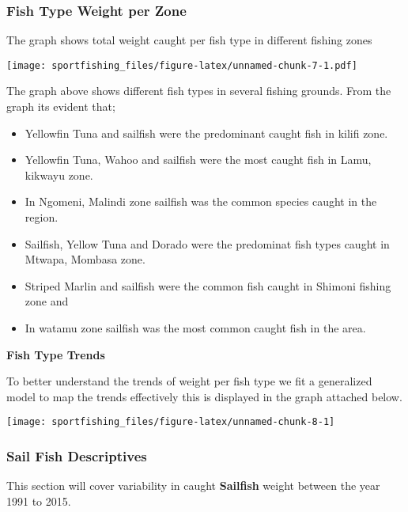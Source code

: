 \documentclass[
]{article}
\providecommand{\tightlist}{%
  \setlength{\itemsep}{0pt}\setlength{\parskip}{0pt}}
\begin{document}
\newpage

\subsubsection{Fish Type Weight per
Zone}\label{fish-type-weight-per-zone}

The graph shows total weight caught per fish type in different fishing
zones

\texttt{[image: sportfishing\_files/figure-latex/unnamed-chunk-7-1.pdf]}

The graph above shows different fish types in several fishing grounds.
From the graph its evident that;

\begin{itemize}
\tightlist
\item
  Yellowfin Tuna and sailfish were the predominant caught fish in kilifi
  zone.
\item
  Yellowfin Tuna, Wahoo and sailfish were the most caught fish in Lamu,
  kikwayu zone.
\item
  In Ngomeni, Malindi zone sailfish was the common species caught in the
  region.
\item
  Sailfish, Yellow Tuna and Dorado were the predominat fish types caught
  in Mtwapa, Mombasa zone.
\item
  Striped Marlin and sailfish were the common fish caught in Shimoni
  fishing zone and
\item
  In watamu zone sailfish was the most common caught fish in the area.
\end{itemize}

\newpage

\textbf{Fish Type Trends}

To better understand the trends of weight per fish type we fit a
generalized model to map the trends effectively this is displayed in the
graph attached below.

\begin{center}\texttt{[image: sportfishing\_files/figure-latex/unnamed-chunk-8-1]} \end{center}

\newpage

\subsubsection{Sail Fish Descriptives}\label{sail-fish-descriptives}

This section will cover variability in caught \textbf{Sailfish} weight
between the year 1991 to 2015.
\end{document}
